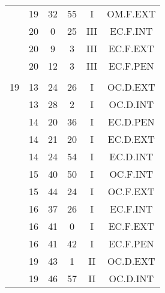 \documentclass[12pt, a4paper]{article}
\begin{document}
\begin{multicols}{3}
{\begin{tabular}{c c c c c c}
	 	 	 	 & 19 & 32 & 55 & I & OM.F.EXT\\%
	 	 	 	 & 20 & 0 & 25 & III & EC.F.INT\\%
	 	 	 	 & 20 & 9 & 3 & III & EC.F.EXT\\%
	 	 	 	 & 20 & 12 & 3 & III & EC.F.PEN\\%
	 	 	 	 & & & & & \\%
	 	 	 	19 & 13 & 24 & 26 & I & OC.D.EXT\\%
	 	 	 	 & 13 & 28 & 2 & I & OC.D.INT\\%
	 	 	 	 & 14 & 20 & 36 & I & EC.D.PEN\\%
	 	 	 	 & 14 & 21 & 20 & I & EC.D.EXT\\%
	 	 	 	 & 14 & 24 & 54 & I & EC.D.INT\\%
	 	 	 	 & 15 & 40 & 50 & I & OC.F.INT\\%
	 	 	 	 & 15 & 44 & 24 & I & OC.F.EXT\\%
	 	 	 	 & 16 & 37 & 26 & I & EC.F.INT\\%
	 	 	 	 & 16 & 41 & 0 & I & EC.F.EXT\\%
	 	 	 	 & 16 & 41 & 42 & I & EC.F.PEN\\%
	 	 	 	 & 19 & 43 & 1 & II & OC.D.EXT\\%
	 	 	 	 & 19 & 46 & 57 & II & OC.D.INT\\%
	 	 \end{tabular}
 	}
\end{multicols}
\end{document}
